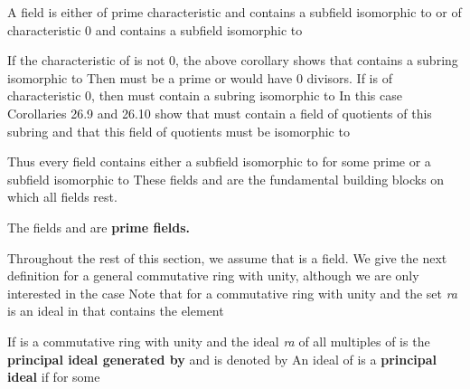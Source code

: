 \documentclass[11pt,oneside]{article}
\begin{document}
\begin{BookBody}

 A field  is either of prime characteristic  and contains a subfield isomorphic to  or of characteristic 0 and contains a subfield isomorphic to 

 If the characteristic of  is not 0, the above corollary shows that  contains a subring isomorphic to  Then  must be a prime  or  would have 0 divisors. If  is of characteristic 0, then  must contain a subring isomorphic to  In this case Corollaries 26.9 and 26.10 show that  must contain a field of quotients of this subring and that this field of quotients must be isomorphic to \BookEnd{\blacklozenge}

Thus every field contains either a subfield isomorphic to  for some prime  or a subfield isomorphic to  These fields  and  are the fundamental building blocks on which all fields rest.

 The fields  and  are\textbf{ prime fields.} \BookEnd{\blacksquare}


\noindent Throughout the rest of this section, we assume that  is a field. We give the next definition for a general commutative ring  with unity, although we are only interested in the case  Note that for a commutative ring  with unity and  the set \BookInline{\{}\textit{ra}  is an ideal in  that contains the element 

 If  is a commutative ring with unity and  the ideal \BookInline{\{}\textit{ra}  of all multiples of  is the\textbf{ principal ideal generated by}  and is denoted by  An ideal  of  is a \textbf{principal ideal} if  for some \BookEnd{\blacksquare}


\end{BookBody}
\end{document}
